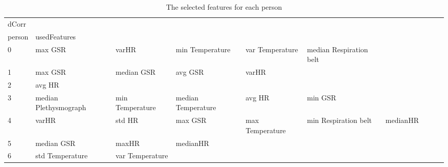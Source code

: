 \begin{landscape}
\begin{table}[]
\centering
\caption{The selected features for each person}
\begin{tabular}{l|llllllll}
dCorr    &                         &                       &                         &                         &                         &                       &                      &          &                      &        \\
person   & usedFeatures            &                       &                         &                         &                         &                       &                      &          &                      &        \\
0        & max GSR                 & varHR                 & min Temperature         & var Temperature         & median Respiration belt &                       &                      &          &                      &        \\
1        & max GSR                 & median GSR            & avg GSR                 & varHR                   &                         &                       &                      &          &                      &        \\
2        & avg HR                  &                       &                         &                         &                         &                       &                      &          &                      &        \\
3        & median Plethysmograph   & min Temperature       & median Temperature      & avg HR                  & min GSR                 &                       &                      &          &                      &        \\
4        & varHR                   & std HR                & max GSR                 & max Temperature         & min Respiration belt    & medianHR              &                      &          &                      &        \\
5        & median GSR              & maxHR                 & medianHR                &                         &                         &                       &                      &          &                      &        \\
6        & std Temperature         & var Temperature       &                         &                         &                         &                       &                      &          &                      &        \\

\end{tabular}
\end{table}
\end{landscape}
